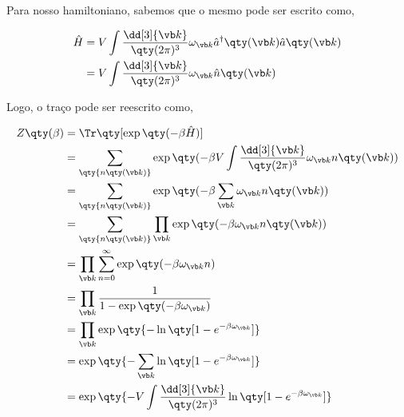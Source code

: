 \documentclass[twoside]{amsart}
\numberwithin{equation}{section}
\begin{document}
\begin{refsection}
Para nosso hamiltoniano, sabemos que o mesmo pode ser escrito como,

\begin{align}
    \hat H&=V\int\frac{\dd[3]{\vb k}}{\qty(2\pi)^3}\omega_{\vb k}{\hat a}^\dagger\qty(\vb k)\hat a\qty(\vb k)\\
    &=V\int\frac{\dd[3]{\vb k}}{\qty(2\pi)^3}\omega_{\vb k}{\hat n}\qty(\vb k)
\end{align}

Logo, o traço pode ser reescrito como,

\begin{align}
    Z\qty(\beta)&=\Tr\qty[\exp\qty(-\beta\hat H)]\\
    &=\sum\limits_{\qty{n\qty(\vb k)}}\exp\qty(-\beta V\int\frac{\dd[3]{\vb k}}{\qty(2\pi)^3}\omega_{\vb k}n\qty(\vb k))\\
    &=\sum\limits_{\qty{n\qty(\vb k)}}\exp\qty(-\beta\sum\limits_{\vb k}\omega_{\vb k}n\qty(\vb k))\\
    &=\sum\limits_{\qty{n\qty(\vb k)}}\prod\limits_{\vb k}\exp\qty(-\beta\omega_{\vb k}n\qty(\vb k))\\
    &=\prod\limits_{\vb k}\sum\limits_{n=0}^\infty\exp\qty(-\beta\omega_{\vb k}n)\\
    &=\prod\limits_{\vb k}\frac{1}{1-\exp\qty(-\beta\omega_{\vb k})}\\
    &=\prod\limits_{\vb k}\exp\qty{-\ln\qty[1-e^{-\beta\omega_{\vb k}}]}\\
    &=\exp\qty{-\sum\limits_{\vb k}\ln\qty[1-e^{-\beta\omega_{\vb k}}]}\\
    &=\exp\qty{-V\int\frac{\dd[3]{\vb k}}{\qty(2\pi)^3}\ln\qty[1-e^{-\beta\omega_{\vb k}}]}
\end{align}

\printbibliography[heading=subbibliography]
\end{refsection}

\end{document}
